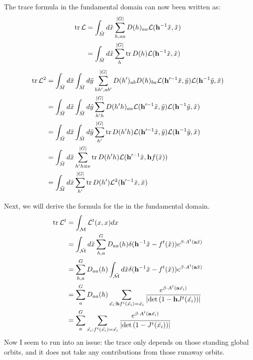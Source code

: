 \begin{description}
The trace formula in the fundamental domain can now been written as:
\begin{align*}
\mbox{\rm tr}\,  {\cal L} &= \int_{\tilde{M}}d\tilde{x}\sum_{h,aa}^{\vert G\vert}D(h)_{aa}{\cal L}(\mathbf{h}^{-1}\tilde{x},\tilde{x})\\
 &= \int_{\tilde{M}}d\tilde{x}\sum_{h}^{\vert G\vert}\mbox{\rm tr}\, D(h){\cal L}(\mathbf{h}^{-1}\tilde{x},\tilde{x})
\end{align*}
\begin{align*}
\mbox{\rm tr}\,  {\cal L}^{2} &= \int_{\tilde{M}}d\tilde{x}\int_{\tilde{M}}d\tilde{y}\sum_{hh^{\prime},ab^{\prime}}^{\vert G\vert}D(h^{\prime})_{ab}D(h)_{ba}{\cal L}(\mathbf{h}^{\prime-1}\tilde{x},\tilde{y}){\cal L}(\mathbf{h}^{-1}\tilde{y},\tilde{x})\\
 &= \int_{\tilde{M}}d\tilde{x}\int_{\tilde{M}}d\tilde{y}\sum_{h^{\prime}h}^{\vert G\vert}D(h^{\prime}h)_{aa}{\cal L}(\mathbf{h}^{\prime-1}\tilde{x},\tilde{y}){\cal L}(\mathbf{h}^{-1}\tilde{y},\tilde{x})\\
 &= \int_{\tilde{M}}d\tilde{x}\int_{\tilde{M}}d\tilde{y}\sum_{h^{\prime}}^{\vert G\vert}\mbox{\rm tr}\,  D(h^{\prime}h){\cal L}(\mathbf{h}^{\prime-1}\tilde{x},\tilde{y}){\cal L}(\mathbf{h}^{-1}\tilde{y},\tilde{x})\\
 &= \int_{\tilde{M}}d\tilde{x}\sum_{h^{\prime}h\equiv e}^{\vert G\vert}\mbox{\rm tr}\,  D(h^{\prime}h){\cal L}(\mathbf{h}^{\prime-1}\tilde{x},\mathbf{h}f(\tilde{x}))\\
 &= \int_{\tilde{M}}d\tilde{x}\sum_{h^{\prime}}^{\vert G\vert}\mbox{\rm tr}\,  D(h^{\prime}){\cal L}^{2}(\mathbf{h}^{\prime-1}\tilde{x},\tilde{x})
\end{align*}

Next, we will derive the formula for the {\Fd} in the
fundamental domain.
\begin{align*}
\mbox{\rm tr}\,  {\cal L}^{t} &= \int_{\mathcal{M}}{\cal L}^{t}(x,x)dx\\
 &= \int_{\tilde{\mathcal{M}}}d\tilde{x}\sum_{h,a}^{G}D_{aa}(h)\delta(\mathbf{h}^{-1}\tilde{x}-f^{t}(\tilde{x}))e^{\beta\cdot A^{t}(\mathbf{a}\tilde{x})}\\
 &= \sum_{h,a}^{G}D_{aa}(h)\int_{\tilde{\mathcal{M}}}d\tilde{x}\delta(\mathbf{h}^{-1}\tilde{x}-f^{t}(\tilde{x}))e^{\beta\cdot A^{t}(\mathbf{a}\tilde{x})}\\
 &= \sum_{a}^{G}D_{aa}(h)\sum_{\tilde{x_{i}}:\mathbf{h}f^{t}(\tilde{x_{i}})=\tilde{x_{i}}}\frac{e^{\beta\cdot A^{t}(\mathbf{a}\tilde{x_{i}})}}{\vert\mbox{\rm det}\, (1-\mathbf{h}J^{t}(\tilde{x_{i}}))\vert}\\
 &= \sum_{a}^{G}\sum_{\tilde{x_{i}}:f^{t}(\tilde{x_{i}})=\tilde{x_{i}}}\frac{e^{\beta\cdot A^{t}(\mathbf{a}\tilde{x_{i}})}}{\vert\mbox{\rm det}\, (1-J^{t}(\tilde{x_{i}}))\vert}
\end{align*}
Now I seem to run into an issue: the trace only depends on those
standing global orbits, and it does not take any contributions from
those runaway orbits.


\end{description}
